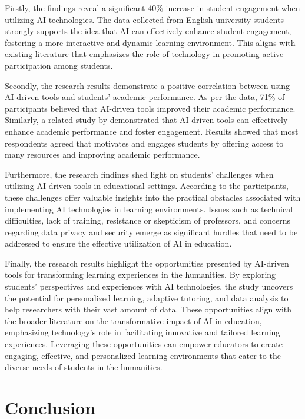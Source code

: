 Firstly, the findings reveal a significant 40\% 
increase in student engagement when utilizing AI technologies. 
The data collected from English university students strongly 
supports the idea that AI can effectively enhance student engagement, 
fostering a more interactive and dynamic learning environment. 
This aligns with existing literature that emphasizes 
the role of technology in promoting active participation among students.


Secondly, the research results demonstrate a positive correlation 
between using AI-driven tools and students' academic performance. 
As per the data, 71\% of participants believed that AI-driven tools improved their academic performance.
Similarly, a related study by \citep{mohammed_exploring_2023} demonstrated 
that AI-driven tools can effectively enhance academic performance and foster engagement. 
Results showed that most respondents agreed that  motivates and 
engages students by offering access to many resources and improving academic performance.


Furthermore, the research findings shed light on students' challenges 
when utilizing AI-driven tools in educational settings. According to
the participants, these challenges offer valuable insights into the
practical obstacles associated with implementing AI technologies in
learning environments. Issues such as technical difficulties, lack
of training, resistance or skepticism of professors, and concerns
regarding data privacy and security emerge as significant hurdles
that need to be addressed to ensure the effective utilization of AI in education.


Finally, the research results highlight the opportunities presented
by AI-driven tools for transforming learning experiences in the humanities.
By exploring students' perspectives and experiences with AI technologies,
the study uncovers the potential for personalized learning, adaptive tutoring,
and data analysis to help researchers with their vast amount of data.
These opportunities align with the broader literature on the transformative
impact of AI in education, emphasizing technology's role in facilitating
innovative and tailored learning experiences. Leveraging these opportunities
can empower educators to create engaging, effective, and personalized learning
environments that cater to the diverse needs of students in the humanities.
\section{Conclusion}

